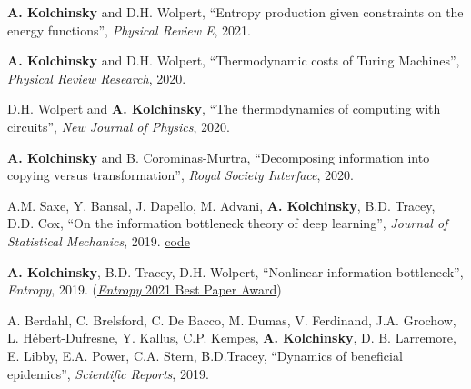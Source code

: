 \textbf{A. Kolchinsky} and D.H. Wolpert, ``Entropy production given constraints on the energy functions'', \emph{Physical Review E}, 2021.  

\textbf{A. Kolchinsky} and D.H. Wolpert, ``Thermodynamic costs of Turing Machines'', \emph{Physical Review Research}, 2020. %
 

D.H. Wolpert and \textbf{A. Kolchinsky}, ``The thermodynamics of computing with circuits'', \emph{New Journal of Physics}, 2020.  %
 

\textbf{A. Kolchinsky} and B. Corominas-Murtra, ``Decomposing information into copying versus transformation'', \emph{Royal Society Interface}, 2020. %
 

A.M. Saxe, Y. Bansal, J. Dapello, M. Advani, \textbf{A. Kolchinsky}, B.D. Tracey, D.D. Cox, ``On the information bottleneck theory of deep learning'',  \emph{Journal of Statistical Mechanics}, 2019.  \href{https://github.com/artemyk/ibsgd/tree/iclr2018}{code}  %

\textbf{A. Kolchinsky}, B.D. Tracey, D.H. Wolpert, ``Nonlinear information bottleneck'', \emph{Entropy}, 2019.
 (\href{https://www.mdpi.com/journal/entropy/awards/1209}{{\emph{Entropy} 2021 Best Paper Award}})  

A. Berdahl, C. Brelsford, C. De Bacco, M. Dumas, V. Ferdinand, J.A. Grochow, L. Hébert-Dufresne, Y. Kallus, C.P. Kempes, \textbf{A. Kolchinsky}, D. B. Larremore, E. Libby, E.A. Power, C.A. Stern, B.D.Tracey, ``Dynamics of beneficial epidemics'', \emph{Scientific Reports}, 2019.  

